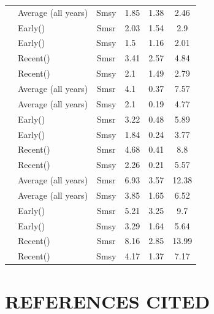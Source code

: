 \documentclass[11pt]{book}
\begin{document}
\begin{longtable}[t]{llcllc}
\cmidrule{2-6}\nopagebreak  & Average (all years) & Smsy & 1.85 & 1.38 & 2.46\\
\cmidrule{2-6}\nopagebreak  & Early() & Smsr & 2.03 & 1.54 & 2.9\\
\cmidrule{2-6}\nopagebreak  & Early() & Smsy & 1.5 & 1.16 & 2.01\\
\cmidrule{2-6}\nopagebreak  & Recent() & Smsr & 3.41 & 2.57 & 4.84\\
\cmidrule{2-6}\nopagebreak \multirow{-6}{*}{\raggedright\arraybackslash UpperYukonR} & Recent() & Smsy & 2.1 & 1.49 & 2.79\\
\cmidrule{1-6}\pagebreak[0]  & Average (all years) & Smsr & 4.1 & 0.37 & 7.57\\
\cmidrule{2-6}\nopagebreak  & Average (all years) & Smsy & 2.1 & 0.19 & 4.77\\
\cmidrule{2-6}\nopagebreak  & Early() & Smsr & 3.22 & 0.48 & 5.89\\
\cmidrule{2-6}\nopagebreak  & Early() & Smsy & 1.84 & 0.24 & 3.77\\
\cmidrule{2-6}\nopagebreak  & Recent() & Smsr & 4.68 & 0.41 & 8.8\\
\cmidrule{2-6}\nopagebreak \multirow{-6}{*}{\raggedright\arraybackslash Whiteandtribs} & Recent() & Smsy & 2.26 & 0.21 & 5.57\\
\cmidrule{1-6}\pagebreak[0]  & Average (all years) & Smsr & 6.93 & 3.57 & 12.38\\
\cmidrule{2-6}\nopagebreak  & Average (all years) & Smsy & 3.85 & 1.65 & 6.52\\
\cmidrule{2-6}\nopagebreak  & Early() & Smsr & 5.21 & 3.25 & 9.7\\
\cmidrule{2-6}\nopagebreak  & Early() & Smsy & 3.29 & 1.64 & 5.64\\
\cmidrule{2-6}\nopagebreak  & Recent() & Smsr & 8.16 & 2.85 & 13.99\\
\cmidrule{2-6}\nopagebreak \multirow{-6}{*}{\raggedright\arraybackslash YukonR Teslinheadwaters} & Recent() & Smsy & 4.17 & 1.37 & 7.17\\* \end{longtable}

\clearpage

\hypertarget{references}{%
\section{REFERENCES CITED}\label{references}}

\noindent
\vspace{-2em}
\setlength{\parindent}{-0.2in}
\setlength{\leftskip}{0.2in}
\setlength{\parskip}{8pt}
\end{document}
